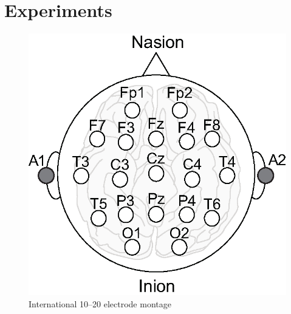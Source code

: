 \documentclass[journal]{IEEEtran}
\begin{document}




\section{Experiments}
\begin{figure}[!t]
\centering
\includegraphics[width=0.6\hsize]{figure/electrodes.eps}
\caption{International 10--20 electrode montage}
\label{fig:electrodes}
\end{figure}
\end{document}
